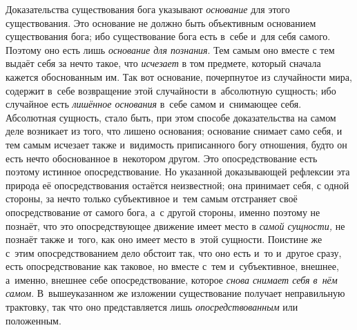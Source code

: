 Доказательства существования бога указывают
{\em основание} для этого существования. Это основание
не должно быть объективным основанием существования бога; ибо существование
бога есть в~себе и~для себя самого. Поэтому оно есть лишь
{\em основание для познания}. Тем самым оно вместе с
тем выдаёт себя за нечто такое, что {\em исчезает} в
том предмете, который сначала кажется обоснованным им. Так вот основание,
почерпнутое из случайности мира, содержит в~себе возвращение этой
случайности в~абсолютную сущность; ибо случайное есть
{\em лишённое основания} в~себе самом и~снимающее себя.
Абсолютная сущность, стало быть, при этом способе доказательства на самом
деле возникает из того, что лишено основания; основание снимает само себя,
и тем самым исчезает также и~видимость приписанного богу отношения, будто
он есть нечто обоснованное в~некотором другом. Это опосредствование есть
поэтому истинное опосредствование. Но указанной доказывающей рефлексии эта
природа её опосредствования остаётся неизвестной; она принимает себя, с
одной стороны, за нечто только субъективное и~тем самым отстраняет своё
опосредствование от самого бога, а~с другой стороны, именно поэтому не
познаёт, что это опосредствующее движение имеет место в
{\em самой сущности,} не познаёт также и~того, как оно
имеет место в~этой сущности. Поистине же с~этим опосредствованием дело
обстоит так, что оно есть и~то и~другое сразу, есть опосредствование как
таковое, но вместе с~тем и~субъективное, внешнее, а~именно, внешнее себе
опосредствование, которое {\em снова снимает себя в~нём
самом}. В~вышеуказанном же изложении существование получает неправильную
трактовку, так что оно представляется лишь
{\em опосредствованным} или положенным.

